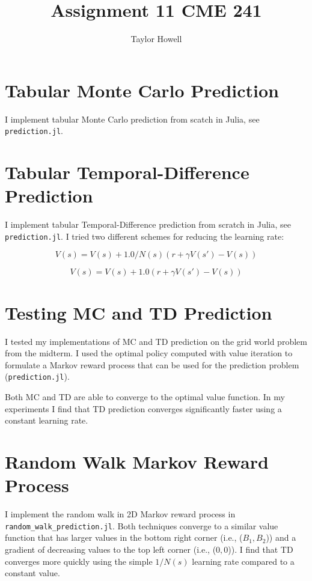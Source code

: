 \documentclass[12pt]{article}
\title{Assignment 11 CME 241}
\author{Taylor Howell}
\begin{document}
\maketitle

\newpage
\section{Tabular Monte Carlo Prediction}
I implement tabular Monte Carlo prediction from scatch in Julia, see \texttt{prediction.jl}.

\section{Tabular Temporal-Difference Prediction}
I implement tabular Temporal-Difference prediction from scratch in Julia, see \texttt{prediction.jl}.
I tried two different schemes for reducing the learning rate:

$$ V(s) = V(s) + 1.0 / N(s) (r + \gamma V(s') - V(s))$$

$$ V(s) = V(s) + 1.0 (r + \gamma V(s') - V(s))$$

\section{Testing MC and TD Prediction}
I tested my implementations of MC and TD prediction on the grid world problem from the midterm. I used the optimal policy computed with value iteration to formulate a Markov reward process that can be used for the prediction problem (\texttt{prediction.jl}). 

Both MC and TD are able to converge to the optimal value function. In my experiments I find that TD prediction converges significantly faster using a constant learning rate.

\section{Random Walk Markov Reward Process}
I implement the random walk in 2D Markov reward process in \texttt{random_walk_prediction.jl}. Both techniques converge to a similar value function that has larger values in the bottom right corner (i.e., ($B_1, B_2$)) and a gradient of decreasing values to the top left corner (i.e., ($0, 0$)). I find that TD converges more quickly using the simple $1 / N(s)$ learning rate compared to a constant value.


\clearpage
\end{document}
